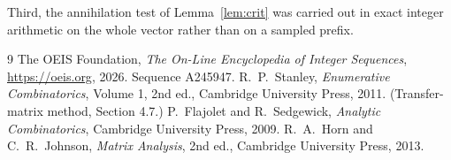 \documentclass[11pt,a4paper]{article}
\theoremstyle{plain}
\theoremstyle{definition}
\begin{document}
Third, the annihilation test of Lemma~\ref{lem:crit} was carried out in exact integer
arithmetic on the whole vector rather than on a sampled prefix.

\begin{thebibliography}{9}
 The OEIS Foundation, \emph{The On-Line Encyclopedia of Integer
Sequences}, \url{https://oeis.org}, 2026. Sequence A245947.
 R.~P.~Stanley, \emph{Enumerative Combinatorics}, Volume 1, 2nd ed.,
Cambridge University Press, 2011. (Transfer-matrix method, Section 4.7.)
 P.~Flajolet and R.~Sedgewick, \emph{Analytic Combinatorics}, Cambridge
University Press, 2009.
 R.~A.~Horn and C.~R.~Johnson, \emph{Matrix Analysis}, 2nd ed., Cambridge
University Press, 2013.
\end{thebibliography}
\end{document}
